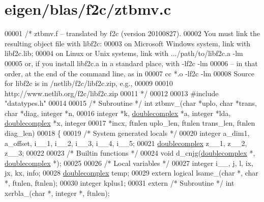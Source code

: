 \hypertarget{eigen_2blas_2f2c_2ztbmv_8c_source}{}\section{eigen/blas/f2c/ztbmv.c}
\label{eigen_2blas_2f2c_2ztbmv_8c_source}

\begin{DoxyCode}
00001 \textcolor{comment}{/* ztbmv.f -- translated by f2c (version 20100827).}
00002 \textcolor{comment}{   You must link the resulting object file with libf2c:}
00003 \textcolor{comment}{    on Microsoft Windows system, link with libf2c.lib;}
00004 \textcolor{comment}{    on Linux or Unix systems, link with .../path/to/libf2c.a -lm}
00005 \textcolor{comment}{    or, if you install libf2c.a in a standard place, with -lf2c -lm}
00006 \textcolor{comment}{    -- in that order, at the end of the command line, as in}
00007 \textcolor{comment}{        cc *.o -lf2c -lm}
00008 \textcolor{comment}{    Source for libf2c is in /netlib/f2c/libf2c.zip, e.g.,}
00009 \textcolor{comment}{}
00010 \textcolor{comment}{        http://www.netlib.org/f2c/libf2c.zip}
00011 \textcolor{comment}{*/}
00012 
00013 \textcolor{preprocessor}{#include "datatypes.h"}
00014 
00015 \textcolor{comment}{/* Subroutine */} \textcolor{keywordtype}{int} ztbmv\_(\textcolor{keywordtype}{char} *uplo, \textcolor{keywordtype}{char} *trans, \textcolor{keywordtype}{char} *diag, integer *n, 
00016     integer *k, \hyperlink{structdoublecomplex}{doublecomplex} *a, integer *lda, \hyperlink{structdoublecomplex}{doublecomplex} *x, integer 
00017     *incx, ftnlen uplo\_len, ftnlen trans\_len, ftnlen diag\_len)
00018 \{
00019     \textcolor{comment}{/* System generated locals */}
00020     integer a\_dim1, a\_offset, i\_\_1, i\_\_2, i\_\_3, i\_\_4, i\_\_5;
00021     \hyperlink{structdoublecomplex}{doublecomplex} z\_\_1, z\_\_2, z\_\_3;
00022 
00023     \textcolor{comment}{/* Builtin functions */}
00024     \textcolor{keywordtype}{void} d\_cnjg(\hyperlink{structdoublecomplex}{doublecomplex} *, \hyperlink{structdoublecomplex}{doublecomplex} *);
00025 
00026     \textcolor{comment}{/* Local variables */}
00027     integer i\_\_, j, l, ix, jx, kx, info;
00028     \hyperlink{structdoublecomplex}{doublecomplex} temp;
00029     \textcolor{keyword}{extern} logical lsame\_(\textcolor{keywordtype}{char} *, \textcolor{keywordtype}{char} *, ftnlen, ftnlen);
00030     integer kplus1;
00031     \textcolor{keyword}{extern} \textcolor{comment}{/* Subroutine */} \textcolor{keywordtype}{int} xerbla\_(\textcolor{keywordtype}{char} *, integer *, ftnlen);

\end{DoxyCode}
